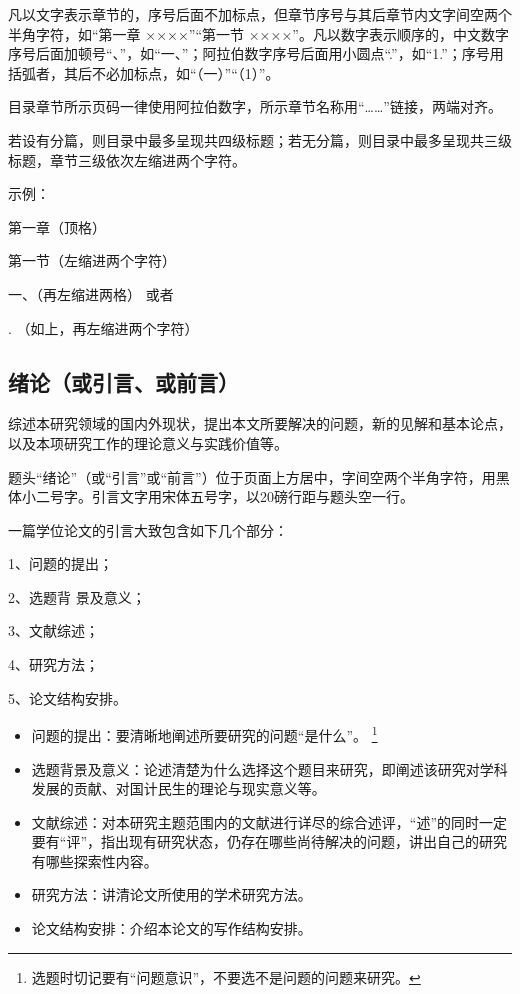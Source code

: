 凡以文字表示章节的，序号后面不加标点，但章节序号与其后章节内文字间空两个半角字符，如“第一章 ××××”“第一节 ××××”。凡以数字表示顺序的，中文数字序号后面加顿号“、”，如“一、”；阿拉伯数字序号后面用小圆点“.”，如“1.”；序号用括弧者，其后不必加标点，如“（一）”“（1）”。

目录章节所示页码一律使用阿拉伯数字，所示章节名称用“……”链接，两端对齐。

若设有分篇，则目录中最多呈现共四级标题；若无分篇，则目录中最多呈现共三级标题，章节三级依次左缩进两个字符。

示例：

\noindent 第一章（顶格）

第一节（左缩进两个字符）

\indent \indent 一、（再左缩进两格） 或者

\indent {}. （如上，再左缩进两个字符）

\subsection{绪论（或引言、或前言）}

综述本研究领域的国内外现状，提出本文所要解决的问题，新的见解和基本论点，以及本项研究工作的理论意义与实践价值等。

题头“绪论”（或“引言”或“前言”）位于页面上方居中，字间空两个半角字符，用黑体小二号字。引言文字用宋体五号字，以20磅行距与题头空一行。

一篇学位论文的引言大致包含如下几个部分：

1、问题的提出；

2、选题背 景及意义；

3、文献综述；

4、研究方法；

5、论文结构安排。

\begin{itemize}
	\item 问题的提出：要清晰地阐述所要研究的问题“是什么”。
	\footnote{选题时切记要有“问题意识”，不要选不是问题的问题来研究。}
	\item 选题背景及意义：论述清楚为什么选择这个题目来研究，即阐述该研究对学科发展的贡献、对国计民生的理论与现实意义等。
	\item 文献综述：对本研究主题范围内的文献进行详尽的综合述评，“述”的同时一定要有“评”，指出现有研究状态，仍存在哪些尚待解决的问题，讲出自己的研究有哪些探索性内容。
	\item 研究方法：讲清论文所使用的学术研究方法。
	\item 论文结构安排：介绍本论文的写作结构安排。
\end{itemize}

